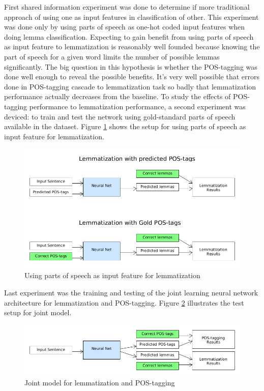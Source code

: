 \documentclass[12pt,a4paper,english
]{tutthesis}
\begin{document}
First shared information experiment was done to determine if more traditional approach of using one as input features in classification of other. This experiment was done only by using parts of speech as one-hot coded input features when doing lemma classification. Expecting to gain benefit from using parts of speech as input feature to lemmatization is reasonably well founded because knowing the part of speech for a given word limits the number of possible lemmas significantly. The big question in this hypothesis is whether the POS-tagging was done well enough to reveal the possible benefits. It's very well possible that errors done in POS-tagging cascade to lemmatization task so badly that lemmatization performance actually decreases from the baseline. To study the effects of POS-tagging performance to lemmatization performance, a second experiment was deviced: to train and test the network using gold-standard parts of speech available in the dataset. Figure \ref{figure:pos_tag_input_experiment} shows the setup for using parts of speech as input feature for lemmatization.

\begin{figure}[htbp]
\caption{Using parts of speech as input feature for lemmatization}
\label{figure:pos_tag_input_experiment}
\centering
\includegraphics[width=15cm]{pos_tag_input_experiment.png}
\end{figure}

Last experiment was the training and testing of the joint learning neural network architecture for lemmatization and POS-tagging. Figure \ref{figure:joint_model_experiment} illustrates the test setup for joint model.

\begin{figure}[htbp]
\caption{Joint model for lemmatization and POS-tagging}
\label{figure:joint_model_experiment}
\centering
\includegraphics[width=15cm]{joint_model_experiment.png}
\end{figure}
\end{document}
